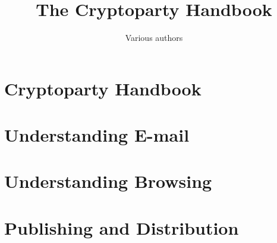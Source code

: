 \documentclass[oribibl,a4paper]{book}
\begin{document}
\title{The Cryptoparty Handbook}
\author{Various authors}

\maketitle
\clearpage
\tableofcontents
\clearpage

\graphicspath{{chapter_00_cryptoparty_handbook}}
\chapter{Cryptoparty Handbook}

\clearpage

\clearpage

\clearpage

\clearpage

\clearpage
\graphicspath{{chapter_01_understanding_email}}
\chapter{Understanding E-mail}

\clearpage

\clearpage

\clearpage

\clearpage

\clearpage
\graphicspath{{chapter_02_understanding_browsing}}
\chapter{Understanding Browsing}

\clearpage

\clearpage

\clearpage

\clearpage

\clearpage

\clearpage

\clearpage
\chapter{Publishing and Distribution}

\clearpage

\clearpage

\clearpage
\end{document}
